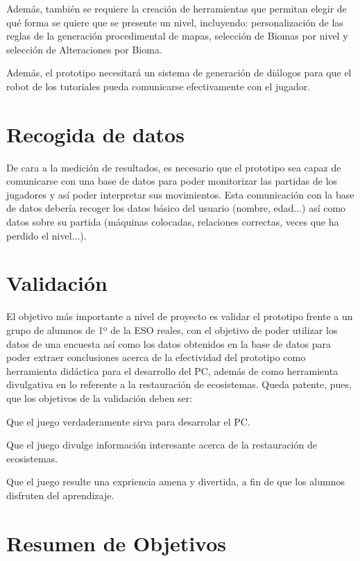 Además, también se requiere la creación de herramientas que permitan elegir de qué forma se quiere que se presente un nivel, incluyendo: personalización de las reglas de la generación procedimental de mapas, selección de Biomas por nivel y selección de Alteraciones por Bioma.

Además, el prototipo necesitará un sistema de generación de diálogos para que el robot de los tutoriales pueda comunicarse efectivamente con el jugador.

\section*{Recogida de datos}

De cara a la medición de resultados, es necesario que el prototipo sea capaz de comunicarse con una base de datos para poder monitorizar las partidas de los jugadores y así poder interpretar sus movimientos. 
Esta comunicación con la base de datos debería recoger los datos básico  del usuario (nombre, edad...) así como datos sobre su partida (máquinas colocadas, relaciones correctas, veces que ha perdido el nivel...).

\section*{Validación}

El objetivo más importante a nivel de proyecto es validar el prototipo frente a un grupo de alumnos de 1º de la ESO reales, con el objetivo de poder utilizar los datos de una encuesta así como los datos obtenidos en la base de datos para poder extraer conclusiones acerca de la efectividad del prototipo como herramienta didáctica para el desarrollo del PC, además de como herramienta divulgativa en lo referente a la restauración de ecosistemas.
Queda patente, pues, que los objetivos de la validación deben ser:
\begin{compactitem}
    \item Que el juego verdaderamente sirva para desarrolar el PC.
    \item Que el juego divulge información interesante acerca de la restauración de ecosistemas.
    \item Que el juego resulte una expriencia amena y divertida, a fin de que los alumnos disfruten del aprendizaje.
\end{compactitem} 

\section*{Resumen de Objetivos}

